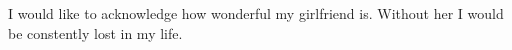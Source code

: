 I would like to acknowledge how wonderful my girlfriend is. Without her I would be constently lost in my life.